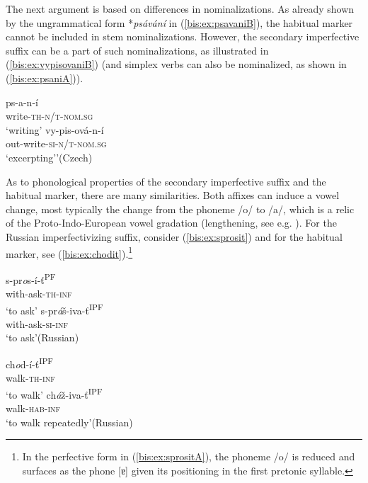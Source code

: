 \documentclass[output=paper]{langscibook}
\begin{document}
\noindent The next argument is based on differences in nominalizations. As already shown by the ungrammatical form *\textit{psávání} in (\ref{bis:ex:psavaniB}), the habitual marker cannot be included in stem nominalizations. However, the secondary imperfective suffix can be a part of such nominalizations, as illustrated in (\ref{bis:ex:vypisovaniB}) (and simplex verbs can also be nominalized, as shown in (\ref{bis:ex:psaniA})).

\ea\label{bis:ex:psani}
\ea\label{bis:ex:psaniA} \gll 
ps-a-n-í \\ 
write-\textsc{th}-\textsc{n/t}-\textsc{nom.sg} \\
\glt ‘writing’
\ex\label{bis:ex:vypisovaniB} \gll vy-pis-ová-n-í \\
out-write-\textsc{si}-\textsc{n/t}-\textsc{nom.sg}\\
\glt ‘excerpting’’\hfill (Czech)
\z
\z

\begin{sloppypar}
\noindent As to phonological properties of the secondary imperfective suffix and the habitual marker, there are many similarities. Both affixes can induce a vowel change, most typically the change from the phoneme /o/ to /a/, which is a relic of the Proto-Indo-European vowel gradation (lengthening, see e.g. \citealt{Nandris.Auty1969}). For the Russian imperfectivizing suffix, consider (\ref{bis:ex:sprosit}) and for the habitual marker, see (\ref{bis:ex:chodit}).\footnote{In the perfective form in (\ref{bis:ex:sprositA}), the phoneme /o/ is reduced and surfaces as the phone [ɐ] given its positioning in the first pretonic syllable.}
\end{sloppypar}

\ea\label{bis:ex:sprosit}
\ea\label{bis:ex:sprositA} \gll 
s-pr\textit{o}s-í-ť\textsuperscript{PF} \\ 
with-ask-\textsc{th}-\textsc{inf} \\
\glt ‘to ask’
\ex\label{bis:ex:sprasivatB} \gll s-pr\textit{á}š-iva-ť\textsuperscript{IPF} \\
with-ask-\textsc{si}-\textsc{inf} \\
\glt ‘to ask’\hfill (Russian)
\z
\z

\ea\label{bis:ex:chodit}
\ea\label{bis:ex:choditA} \gll 
ch\textit{o}d-í-ť\textsuperscript{IPF} \\ 
walk-\textsc{th}-\textsc{inf} \\
\glt ‘to walk’
\ex\label{bis:ex:chazivatB} \gll ch\textit{á}ž-iva-ť\textsuperscript{IPF} \\
walk-\textsc{hab}-\textsc{inf} \\
\glt ‘to walk repeatedly’\hfill (Russian)
\z
\z
\end{document}
